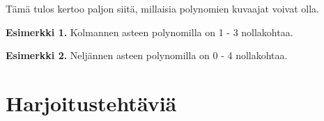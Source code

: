 Tämä tulos kertoo paljon siitä, millaisia polynomien kuvaajat voivat olla. 

\textbf{Esimerkki 1.} Kolmannen asteen polynomilla on 1 - 3 nollakohtaa.


\textbf{Esimerkki 2.} Neljännen asteen polynomilla on 0 - 4 nollakohtaa.



\section{Harjoitustehtäviä}
